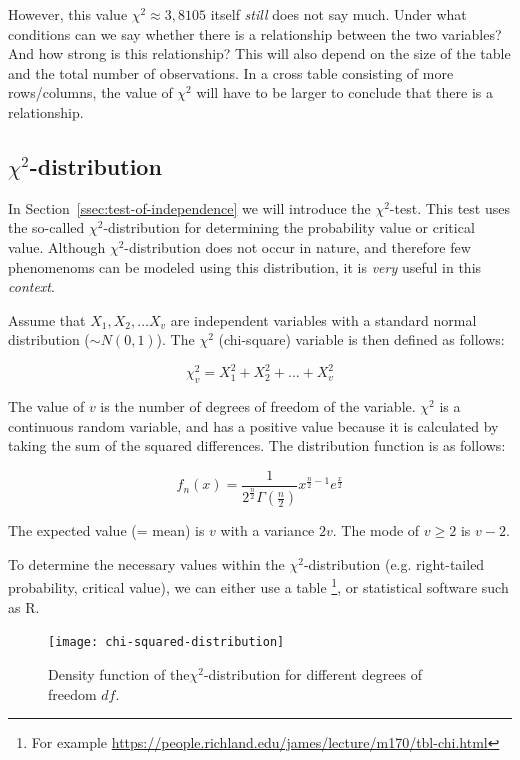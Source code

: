 However, this value $\chi^2 \approx 3,8105$ itself \emph{still} does not say much. Under what conditions can we say whether there is a relationship between the two variables? And how strong is this relationship? This will also depend on the size of the table and the total number of observations. In a cross table consisting of more rows/columns, the value of $\chi^2$ will have to be larger to conclude that there is a relationship.

\subsection[Chi-squared Distribution]{$\chi^{2}$-distribution}
\label{ssec:chi-squared-distribution}

In Section~\ref{ssec:test-of-independence} we will introduce the $\chi^2$-test. This test uses the so-called $\chi^2$-distribution for determining the probability value or critical value. Although $\chi^2$-distribution does not occur in nature, and therefore few phenomenoms can be modeled using this distribution, it is \emph{very} useful in this \emph{context}.

Assume that  $X_{1}, X_{2}, \dots X_{v}$ are independent variables with a standard normal distribution ($\sim N(0,1)$). The $\chi^{2}$ (chi-square) variable is then defined as follows:

\[ \chi^{2}_{v} = X_{1}^{2} + X_{2}^{2} + \dots + X_{v}^{2} \]

The value of $v$ is the number of degrees of freedom of the variable. $\chi^{2}$ is a continuous random variable, and has a positive value because it is calculated by taking the sum of the squared differences. The distribution function is as follows:

\[ f_{n}(x) = \frac{1}{2^{\frac{n}{2}}\Gamma(\frac{n}{2})} x^{\frac{n}{2} -1} e^{\frac{x}{2}} \]

The expected value (= mean) is $v$ with a variance $2v$. The mode of $v \geq 2$ is $v-2$.

To determine the necessary values within the $\chi^{2}$-distribution (e.g. right-tailed probability, critical value), we can either use a table \footnote{For example \url{https://people.richland.edu/james/lecture/m170/tbl-chi.html}}, or statistical software such as R.

\begin{figure}
  \texttt{[image: chi-squared-distribution]}
  \caption{Density function of the$\chi^2$-distribution for different degrees of freedom $df$.}
  \label{fig:chi-squared-distribution}
\end{figure}

